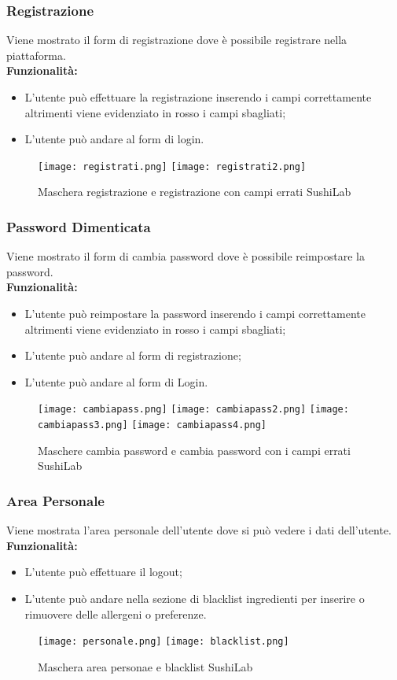 \subsubsection{Registrazione}
Viene mostrato il form di registrazione dove è possibile registrare nella piattaforma.\\
\textbf{Funzionalità:}
\begin{itemize}
    \item L'utente può effettuare la registrazione inserendo i campi correttamente altrimenti viene evidenziato in rosso i campi sbagliati;
    \item L'utente può andare al form di login.
\end{itemize}
\begin{figure}[H]
    \centering
    \texttt{[image: registrati.png]}
    \texttt{[image: registrati2.png]}
    \caption{Maschera registrazione e registrazione con campi errati SushiLab}
\end{figure}
\pagebreak

\subsubsection{Password Dimenticata}
Viene mostrato il form di cambia password dove è possibile reimpostare la password.\\
\textbf{Funzionalità:}
\begin{itemize}
    \setlength\itemsep{.1em}
    \item L'utente può reimpostare la password inserendo i campi correttamente altrimenti viene evidenziato in rosso i campi sbagliati;
    \item L'utente può andare al form di registrazione;
    \item L'utente può andare al form di Login.
\end{itemize}
\begin{figure}[H]
    \centering
    \texttt{[image: cambiapass.png]}
    \texttt{[image: cambiapass2.png]}
    \texttt{[image: cambiapass3.png]}
    \texttt{[image: cambiapass4.png]}
    \caption{Maschere cambia password e cambia password con i campi errati  SushiLab}
\end{figure}
\pagebreak

\subsubsection{Area Personale}
Viene mostrata l'area personale dell'utente dove si può vedere i dati dell'utente.
\textbf{Funzionalità:}
\begin{itemize}
    \item L'utente può effettuare il logout;
    \item L'utente può andare nella sezione di blacklist ingredienti per inserire o rimuovere delle allergeni o preferenze.
\end{itemize}
\begin{figure}[H]
    \centering
    \texttt{[image: personale.png]}
    \texttt{[image: blacklist.png]}
    \caption{Maschera area personae e blacklist SushiLab}
\end{figure}
\label{cap:menu.component}


